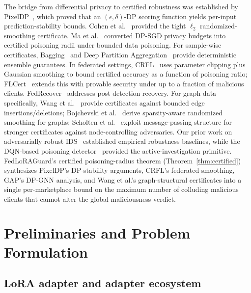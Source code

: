 \documentclass[12pt,a4paper]{article}
\theoremstyle{definition}
\theoremstyle{remark}
\newcommand{\modelname}{FedLoRAGuard}
\begin{document}
The bridge from differential privacy to certified robustness was established by PixelDP~\cite{lecuyer2019certified}, which proved that an $(\epsilon, \delta)$-DP scoring function yields per-input prediction-stability bounds. Cohen et al.~\cite{cohen2019certified} provided the tight $\ell_2$ randomized-smoothing certificate. Ma et al.~\cite{ma2019data} converted DP-SGD privacy budgets into certified poisoning radii under bounded data poisoning. For sample-wise certificates, Bagging~\cite{jia2021intrinsic} and Deep Partition Aggregation~\cite{levine2021deep} provide deterministic ensemble guarantees. In federated settings, CRFL~\cite{xie2021crfl} uses parameter clipping plus Gaussian smoothing to bound certified accuracy as a function of poisoning ratio; FLCert~\cite{cao2022flcert} extends this with provable security under up to a fraction of malicious clients. FedRecover~\cite{cao2023fedrecover} addresses post-detection recovery. For graph data specifically, Wang et al.~\cite{wang2021certgnn} provide certificates against bounded edge insertions/deletions; Bojchevski et al.~\cite{bojchevski2020sparse} derive sparsity-aware randomized smoothing for graphs; Scholten et al.~\cite{scholten2022randomized} exploit message-passing structure for stronger certificates against node-controlling adversaries. Our prior work on adversarially robust IDS~\cite{anaedevha2024adversarial} established empirical robustness baselines, while the DQN-based poisoning detector~\cite{anaedevha2025dqn} provided the active-investigation primitive. \modelname{}'s certified poisoning-radius theorem (Theorem~\ref{thm:certified}) synthesizes PixelDP's DP-stability arguments, CRFL's federated smoothing, GAP's DP-GNN analysis, and Wang et al.'s graph-structural certificates into a single per-marketplace bound on the maximum number of colluding malicious clients that cannot alter the global maliciousness verdict.


\section{Preliminaries and Problem Formulation}
\label{sec:preliminaries}

\subsection{LoRA adapter and adapter ecosystem}
\end{document}
